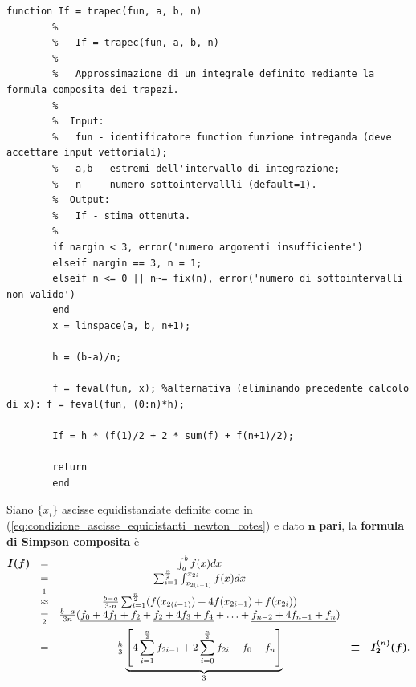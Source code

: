 \begin{algorithm}
	\caption{Implementazione formula dei trapezi composta.}\label{alg:trapec}
	\begin{lstlisting}[style=Matlab-editor]
		function If = trapec(fun, a, b, n)
		%   
		%   If = trapec(fun, a, b, n)
		%
		%   Approssimazione di un integrale definito mediante la formula composita dei trapezi.
		%
		%  Input:
		%   fun - identificatore function funzione intreganda (deve accettare input vettoriali);
		%   a,b - estremi dell'intervallo di integrazione;
		%   n   - numero sottointervallli (default=1).
		%  Output:
		%   If - stima ottenuta.
		%
		if nargin < 3, error('numero argomenti insufficiente')
		elseif nargin == 3, n = 1;
		elseif n <= 0 || n~= fix(n), error('numero di sottointervalli non valido')
		end
		x = linspace(a, b, n+1);
		
		h = (b-a)/n;
		
		f = feval(fun, x); %alternativa (eliminando precedente calcolo di x): f = feval(fun, (0:n)*h);
		
		If = h * (f(1)/2 + 2 * sum(f) + f(n+1)/2);
		
		return
		end
	\end{lstlisting}
\end{algorithm}

\begin{definition}
    Siano $\{x_i\}$ ascisse equidistanziate definite come in (\ref{eq:condizione_ascisse_equidistanti_newton_cotes}) e dato $\boldsymbol n$ \textbf{pari}, la \textbf{formula di Simpson composita} è
    \begin{equation}\label{eq:formula_simpson_composita}
        \begin{matrix}
            \boldsymbol{I(f)}&=&\int_a^bf(x)dx\\
            &=&\sum_{i=1}^{\frac{n}{2}}\int_{x_{2(i-1)}}^{x_{2i}}f(x)dx\\
            &\overset{\footnotemark}{\approx}&\frac{b-a}{3\cdot n}\sum_{i=1}^{\frac{n}{2}}(f(x_{2(i-1)})+4f(x_{2i-1})+f(x_{2i}))\\
            &\underset{\footnotemark}{=}&\frac{b-a}{3n}(\underline{f_0+4f_1+f_2}+\underline{f_2+4f_3+f_4}+\hdots+\underline{f_{n-2}+4f_{n-1}+f_n})\\
            &=&\frac{h}{3}\underbrace{\left[4\sum_{i=1}^{\frac{n}{2}}f_{2i-1}+2\sum_{i=0}^{\frac{n}{2}}f_{2i}-f_0-f_n\right]}_{\footnotemark}&\boldsymbol\equiv& \boldsymbol{I_2^{(n)}(f)}.
        \end{matrix}
    \end{equation}
\end{definition}

